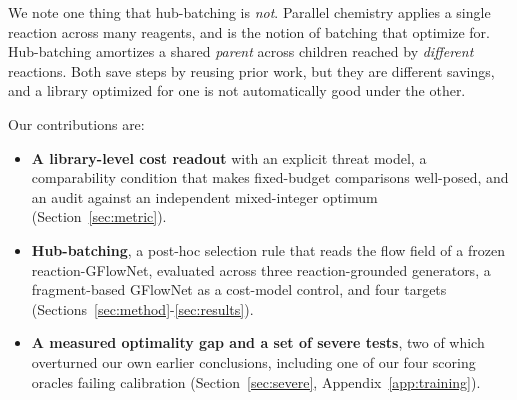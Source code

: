 \documentclass{article}
\begin{document}
We note one thing that hub-batching is \emph{not}. Parallel chemistry applies a single
reaction across many reagents, and is the notion of batching that \citet{fromer2025diversity} optimize for. Hub-batching amortizes a shared \emph{parent}
across children reached by \emph{different} reactions. Both save steps by reusing prior
work, but they are different savings, and a library optimized for one is not automatically good under the other.

Our contributions are:
\begin{itemize}
\itemsep0.15em
\item \textbf{A library-level cost readout} with an explicit threat model, a comparability
      condition that makes fixed-budget comparisons well-posed, and an audit against an
      independent mixed-integer optimum (Section~\ref{sec:metric}).
\item \textbf{Hub-batching}, a post-hoc selection rule that reads the flow field of a
      frozen reaction-GFlowNet, evaluated across three reaction-grounded generators, a
      fragment-based GFlowNet as a cost-model control, and four targets
      (Sections~\ref{sec:method}-\ref{sec:results}).
\item \textbf{A measured optimality gap and a set of severe tests}, two of which
      overturned our own earlier conclusions, including one of our four scoring oracles
      failing calibration (Section~\ref{sec:severe}, Appendix~\ref{app:training}).
\end{itemize}
\end{document}
